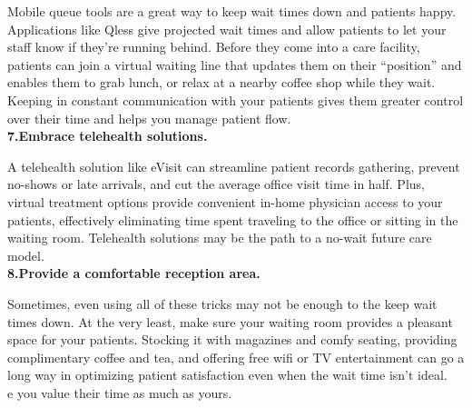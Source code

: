 \documentclass[12]{article}
\begin{document}
		 Mobile queue tools are a great way to keep wait times down and patients happy. Applications like Qless give projected wait times and allow patients to let your staff know if they’re running behind. Before they come into a care facility, patients can join a virtual waiting line that updates them on their “position” and enables them to grab lunch, or relax at a nearby coffee shop while they wait. Keeping in constant communication with your patients gives them greater control over their time and helps you manage patient flow.\\
		 
		 \textbf{7.Embrace telehealth solutions.\\}
		 
		 A telehealth solution like eVisit can streamline patient records gathering, prevent no-shows or late arrivals, and cut the average office visit time in half. Plus, virtual treatment options provide convenient in-home physician access to your patients, effectively eliminating time spent traveling to the office or sitting in the waiting room. Telehealth solutions may be the path to a no-wait future care model.\\
		 
		 \textbf{8.Provide a comfortable reception area.\\}
		 
		 Sometimes, even using all of these tricks may not be enough to the keep wait times down. At the very least, make sure your waiting room provides a pleasant space for your patients. Stocking it with magazines and comfy seating, providing complimentary coffee and tea, and offering free wifi or TV entertainment can go a long way in optimizing patient satisfaction even when the wait time isn’t ideal.\\
		 e you value their time as much as yours.\\
\end{document}
